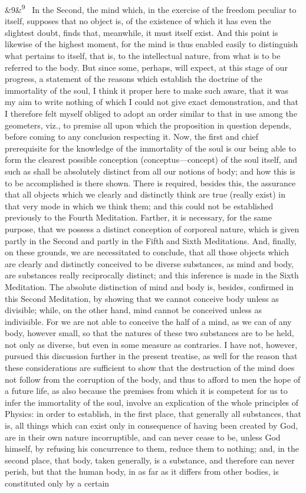 \documentclass[12pt]{article}
\newcommand{\para}[1][]{\par\noindent\ifx&#1&\else\textsuperscript{\footnotesize #1}~\fi}
\begin{document}
\para[9] In the Second, the mind which, in the exercise of the freedom peculiar to itself, supposes that no object is, of the existence of which it has even the slightest doubt, finds that, meanwhile, it must itself exist. And this point is likewise of the highest moment, for the mind is thus enabled easily to distinguish what pertains to itself, that is, to the intellectual nature, from what is to be referred to the body. But since some, perhaps, will expect, at this stage of our progress, a statement of the reasons which establish the doctrine of the immortality of the soul, I think it proper here to make such aware, that it was my aim to write nothing of which I could not give exact demonstration, and that I therefore felt myself obliged to adopt an order similar to that in use among the geometers, viz., to premise all upon which the proposition in question depends, before coming to any conclusion respecting it. Now, the first and chief prerequisite for the knowledge of the immortality of the soul is our being able to form the clearest possible conception (conceptus---concept) of the soul itself, and such as shall be absolutely distinct from all our notions of body; and how this is to be accomplished is there shown. There is required, besides this, the assurance that all objects which we clearly and distinctly think are true (really exist) in that very mode in which we think them; and this could not be established previously to the Fourth Meditation. Farther, it is necessary, for the same purpose, that we possess a distinct conception of corporeal nature, which is given partly in the Second and partly in the Fifth and Sixth Meditations. And, finally, on these grounds, we are necessitated to conclude, that all those objects which are clearly and distinctly conceived to be diverse substances, as mind and body, are substances really reciprocally distinct; and this inference is made in the Sixth Meditation. The absolute distinction of mind and body is, besides, confirmed in this Second Meditation, by showing that we cannot conceive body unless as divisible; while, on the other hand, mind cannot be conceived unless as indivisible. For we are not able to conceive the half of a mind, as we can of any body, however small, so that the natures of these two substances are to be held, not only as diverse, but even in some measure as contraries. I have not, however, pursued this discussion further in the present treatise, as well for the reason that these considerations are sufficient to show that the destruction of the mind does not follow from the corruption of the body, and thus to afford to men the hope of a future life, as also because the premises from which it is competent for us to infer the immortality of the soul, involve an explication of the whole principles of Physics: in order to establish, in the first place, that generally all substances, that is, all things which can exist only in consequence of having been created by God, are in their own nature incorruptible, and can never cease to be, unless God himself, by refusing his concurrence to them, reduce them to nothing; and, in the second place, that body, taken generally, is a substance, and therefore can never perish, but that the human body, in as far as it differs from other bodies, is constituted only by a certain 
\end{document}
